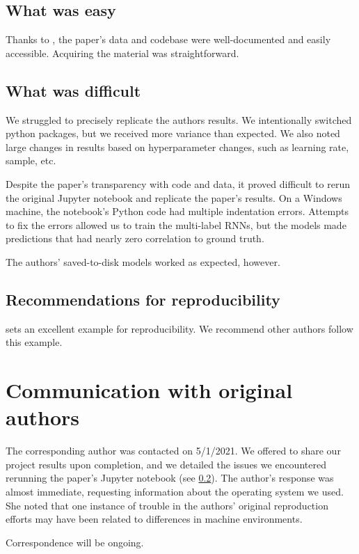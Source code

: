 \documentclass[11pt,a4paper]{article}
\begin{document}
\subsection{What was easy}
Thanks to \citeauthor{burger_2021}, the paper's data and codebase were well-documented and easily accessible. Acquiring the material was straightforward. 

\subsection{What was difficult}
\label{section:what_was_difficult}
We struggled to precisely replicate the authors results. We intentionally switched python packages, but we received more variance than expected. We also noted large changes in results based on hyperparameter changes, such as learning rate, sample, etc. 

Despite the paper's transparency with code and data, it proved difficult to rerun the original Jupyter notebook and replicate the paper's results. On a Windows machine, the notebook's Python code had multiple indentation errors. Attempts to fix the errors allowed us to train the multi-label RNNs, but the models made predictions that had nearly zero correlation to ground truth.

The authors' saved-to-disk models worked as expected, however.

\subsection{Recommendations for reproducibility}
\citeauthor{burger_2021} sets an excellent example for reproducibility. We recommend other authors follow this example.

\section{Communication with original authors}
The corresponding author was contacted on 5/1/2021. We offered to share our project results upon completion, and we detailed the issues we encountered rerunning the paper's Jupyter notebook (see \ref{section:what_was_difficult}). The author's response was almost immediate, requesting information about the operating system we used. She noted that one instance of trouble in the authors' original reproduction efforts may have been related to differences in machine environments.

Correspondence will be ongoing.




\end{document}
